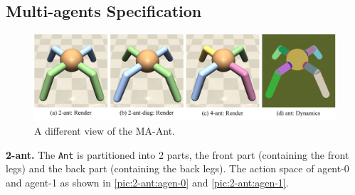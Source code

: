 \documentclass{article}
\begin{document}
\subsection{Multi-agents Specification}
\begin{figure}[H]
  \centering
  \includegraphics[width=\linewidth]{assets/appendix/ma-ant.pdf}
  \caption{A different view of the MA-Ant.}
  \label{pic:ma-ant}
\end{figure}
\textbf{2-ant.} The \texttt{Ant} is partitioned into 2 parts, the front part (containing the front legs) and the back part (containing the back legs). The action space of agent-0 and agent-1 as shown in \autoref{pic:2-ant:agen-0} and \autoref{pic:2-ant:agen-1}.
\end{document}
